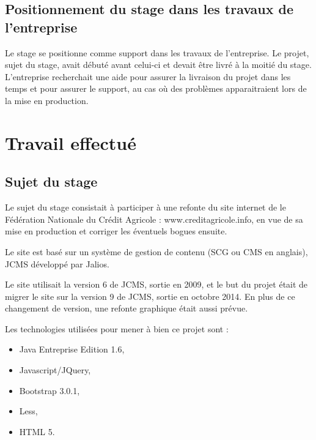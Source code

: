 \documentclass[12pt,a4paper]{article}
\begin{document}
\subsection{Positionnement du stage dans les travaux de l'entreprise}
Le stage se positionne comme support dans les travaux de l'entreprise. Le projet, sujet du stage, avait débuté avant celui-ci et devait être livré à la moitié du stage. L'entreprise recherchait une aide pour assurer la livraison du projet dans les temps et pour assurer le support, au cas où des problèmes apparaitraient lors de la mise en production.

\newpage

\section{Travail effectué}
\subsection{Sujet du stage}
Le sujet du stage consistait à participer à une refonte du site internet de le Fédération Nationale du Crédit Agricole : www.creditagricole.info, en vue de sa mise en production et corriger les éventuels bogues ensuite.\par
Le site est basé sur un système de gestion de contenu (SCG ou CMS en anglais), \gls{JCMS} développé par Jalios.\par
Le site utilisait la version 6 de \gls{JCMS}, sortie en 2009, et le but du projet était de migrer le site sur la version 9 de \gls{JCMS}, sortie en octobre 2014. En plus de ce changement de version, une refonte graphique était aussi prévue.\par
Les technologies utilisées pour mener à bien ce projet sont :
\begin{itemize}
\item Java Entreprise Edition 1.6,
\item Javascript/JQuery,
\item Bootstrap 3.0.1,
\item Less,
\item HTML 5.
\end{itemize}
\end{document}
